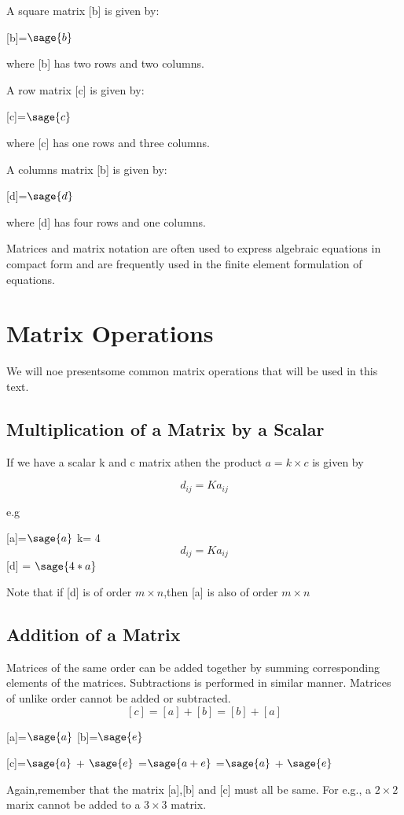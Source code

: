 \documentclass[12pt]{report}
\begin{document}
A square matrix [b] is given by:
\begin{center}
[b]=$\sage{b}$
\end{center}
where [b] has two rows and two columns.

A row matrix [c] is given by:
\begin{center}
[c]=$\sage{c}$
\end{center}
where [c] has one rows and three columns.

A columns matrix [b] is given by:
\begin{center}
[d]=$\sage{d}$
\end{center}
where [d] has four rows and one columns.

Matrices and matrix notation are often used to express algebraic equations in compact form and are frequently used in the finite element formulation of equations.
\section{Matrix Operations}
We will noe presentsome common matrix operations that will be used in this text.
\subsection{Multiplication of a Matrix by a Scalar}
If we have a scalar k and c matrix athen the product $a = k \times c $ is given by
\begin{center}
\[d_{{ij}} = Ka_{{ij}}\]
\end{center}
e.g
\begin{center}
[a]=$\sage{a}$
k= 4\\
\[d_{{ij}} = Ka_{{ij}}\]
[d] = $\sage{4*a}$
\end{center}
Note that if [d] is of order $ m \times n $,then [a] is also of order $ m \times n $
\subsection{Addition of a Matrix}
Matrices of the same order can be added together by summing corresponding elements of the matrices. Subtractions is performed in similar manner. Matrices of unlike order cannot be added or subtracted.
\[ [c]=[a]+[b]= [b]+[a] \]
\begin{center}

[a]=$\sage{a}$
[b]=$\sage{e}$


[c]=$\sage{a}$ + $\sage{e}$
=$\sage{a+e}$
=$\sage{a}$ + $\sage{e}$
\end{center}
Again,remember that the matrix [a],[b] and [c] must all be same. For e.g., a $ 2 \times 2 $ marix cannot be added to a $ 3 \times 3 $ matrix.
\end{document}
